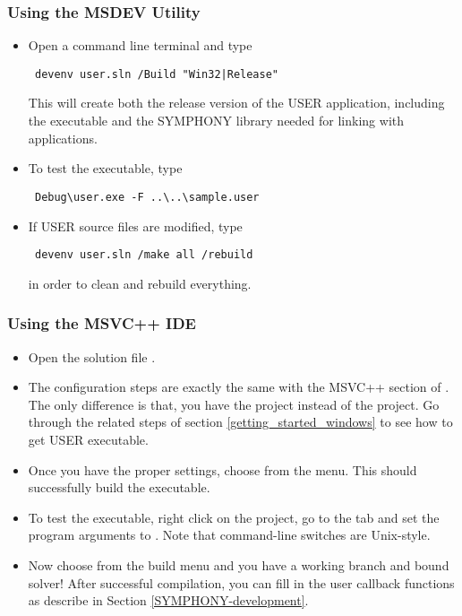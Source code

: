 \subsubsection{Using the MSDEV Utility}
\begin{itemize}
\item Open a command line terminal and type
{\color{Brown}
\begin{verbatim}
 devenv user.sln /Build "Win32|Release"
\end{verbatim}
} 
This will create both the release version of the USER application, including
the executable  and the SYMPHONY library needed for linking with
applications.

\item To test the executable, type 
{\color{Brown}
\begin{verbatim}
 Debug\user.exe -F ..\..\sample.user
\end{verbatim}
}
\item If USER source files are modified, type 
{\color{Brown}
\begin{verbatim}
 devenv user.sln /make all /rebuild
\end{verbatim}
}
in order to clean and rebuild everything.
\end{itemize} 

\subsubsection{Using the MSVC++ IDE}

\begin{itemize}
\item Open the solution file .

\item 
The configuration steps are exactly the same with the MSVC++ section of 
. The only 
difference is that, you have the  project instead of the
 project. Go through the related steps of section 
\ref{getting_started_windows} to see how to get USER executable. 

\item
Once you have the proper settings, choose  from the  menu. This should successfully 
build the executable.

\item
To test the executable, right click on the  project, go to the
 tab and set the program arguments to 
. Note that command-line switches are 
Unix-style.

\item
Now choose  from the build menu and you have a working branch
and bound solver! After successful compilation, you can fill in the user
callback functions as describe in Section \ref{SYMPHONY-development}.
\end{itemize}

